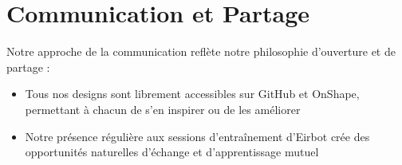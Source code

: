 \documentclass{article}
\begin{document}
\section{Communication et Partage}

Notre approche de la communication reflète notre philosophie d'ouverture et de partage :
\begin{itemize}
    \item Tous nos designs sont librement accessibles sur GitHub et OnShape, permettant à chacun de s'en inspirer ou de les améliorer
    \item Notre présence régulière aux sessions d'entraînement d'Eirbot crée des opportunités naturelles d'échange et d'apprentissage mutuel
\end{itemize}
\end{document}
